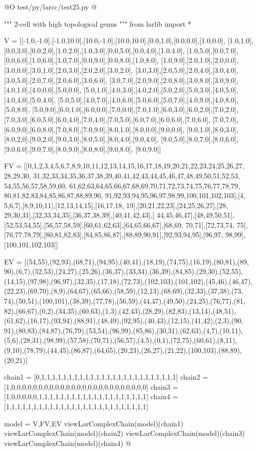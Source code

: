 \documentclass[11pt,oneside]{article}    %
\begin{document}
@O test/py/larcc/test25.py
@{""" 2-cell with high topological genus """
from larlib import *

V = [[-1.0,-1.0],[-1.0,10.0],[10.0,-1.0],[10.0,10.0],[0.0,1.0],[0.0,0.0],[1.0,0.0],
[1.0,1.0],[0.0,3.0],[0.0,2.0],[1.0,2.0],[1.0,3.0],[0.0,5.0],[0.0,4.0],[1.0,4.0],
[1.0,5.0],[0.0,7.0],[0.0,6.0],[1.0,6.0],[1.0,7.0],[0.0,9.0],[0.0,8.0],[1.0,8.0],
[1.0,9.0],[2.0,1.0],[2.0,0.0],[3.0,0.0],[3.0,1.0],[2.0,3.0],[2.0,2.0],[3.0,2.0],
[3.0,3.0],[2.0,5.0],[2.0,4.0],[3.0,4.0],[3.0,5.0],[2.0,7.0],[2.0,6.0],[3.0,6.0],
[3.0,7.0],[2.0,9.0],[2.0,8.0],[3.0,8.0],[3.0,9.0],[4.0,1.0],[4.0,0.0],[5.0,0.0],
[5.0,1.0],[4.0,3.0],[4.0,2.0],[5.0,2.0],[5.0,3.0],[4.0,5.0],[4.0,4.0],[5.0,4.0],
[5.0,5.0],[4.0,7.0],[4.0,6.0],[5.0,6.0],[5.0,7.0],[4.0,9.0],[4.0,8.0],[5.0,8.0],
[5.0,9.0],[6.0,1.0],[6.0,0.0],[7.0,0.0],[7.0,1.0],[6.0,3.0],[6.0,2.0],[7.0,2.0],
[7.0,3.0],[6.0,5.0],[6.0,4.0],[7.0,4.0],[7.0,5.0],[6.0,7.0],[6.0,6.0],[7.0,6.0],
[7.0,7.0],[6.0,9.0],[6.0,8.0],[7.0,8.0],[7.0,9.0],[8.0,1.0],[8.0,0.0],[9.0,0.0],
[9.0,1.0],[8.0,3.0],[8.0,2.0],[9.0,2.0],[9.0,3.0],[8.0,5.0],[8.0,4.0],[9.0,4.0],
[9.0,5.0],[8.0,7.0],[8.0,6.0],[9.0,6.0],[9.0,7.0],[8.0,9.0],[8.0,8.0],[9.0,8.0],
[9.0,9.0]]

FV = [[0,1,2,3,4,5,6,7,8,9,10,11,12,13,14,15,16,17,18,19,20,21,22,23,24,25,26,27,
28,29,30, 31,32,33,34,35,36,37,38,39,40,41,42,43,44,45,46,47,48,49,50,51,52,53,
54,55,56,57,58,59,60, 61,62,63,64,65,66,67,68,69,70,71,72,73,74,75,76,77,78,79,
80,81,82,83,84,85,86,87,88,89,90, 91,92,93,94,95,96,97,98,99,100,101,102,103],[4,
5,6,7],[8,9,10,11],[12,13,14,15],[16,17,18, 19],[20,21,22,23],[24,25,26,27],[28,
29,30,31],[32,33,34,35],[36,37,38,39],[40,41,42,43],[ 44,45,46,47],[48,49,50,51],
[52,53,54,55],[56,57,58,59],[60,61,62,63],[64,65,66,67],[68,69, 70,71],[72,73,74,
75],[76,77,78,79],[80,81,82,83],[84,85,86,87],[88,89,90,91],[92,93,94,95],[96,97,
98,99],[100,101,102,103]]

EV = [(54,55),(92,93),(68,71),(94,95),(40,41),(18,19),(74,75),(16,19),(80,81),(89,
90),(6,7),(52,53),(24,27),(25,26),(36,37),(33,34),(36,39),(84,85),(29,30),(52,55),
(14,15),(97,98),(96,97),(32,35),(17,18),(72,73),(102,103),(101,102),(45,46),(46,47),
(22,23),(69,70),(8,9),(64,67),(65,66),(58,59),(12,13),(68,69),(32,33),(37,38),(73,
74),(50,51),(100,101),(38,39),(77,78),(56,59),(44,47),(49,50),(24,25),(76,77),(81,
82),(66,67),(0,2),(34,35),(60,63),(1,3),(42,43),(28,29),(82,83),(13,14),(48,51),
(61,62),(16,17),(93,94),(88,91),(48,49),(92,95),(40,43),(12,15),(41,42),(2,3),(90,
91),(80,83),(84,87),(76,79),(53,54),(96,99),(85,86),(30,31),(62,63),(4,7),(10,11),
(5,6),(28,31),(98,99),(57,58),(70,71),(56,57),(4,5),(0,1),(72,75),(60,61),(8,11),
(9,10),(78,79),(44,45),(86,87),(64,65),(20,23),(26,27),(21,22),(100,103),(88,89),
(20,21)]

chain1 = [0,1,1,1,1,1,1,1,1,1,1,1,1,1,1,1,1,1,1,1,1,1,1,1,1,1]
chain2 = [1,0,0,0,0,0,0,0,0,0,0,0,0,0,0,0,0,0,0,0,0,0,0,0,0,0]
chain3 = [1,0,0,0,0,0,1,1,1,1,1,1,1,1,1,1,1,1,1,1,1,1,1,1,1,1]
chain4 = [1,1,1,1,1,1,1,1,1,1,1,1,1,1,1,1,1,1,1,1,1,1,1,1,1,1]

model = V,FV,EV
viewLarComplexChain(model)(chain1)
viewLarComplexChain(model)(chain2)
viewLarComplexChain(model)(chain3)
viewLarComplexChain(model)(chain4)
@}
\end{document}
